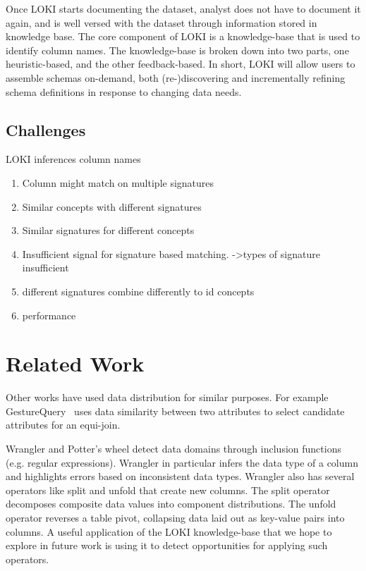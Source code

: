 \documentclass{vldb}
\begin{document}
Once LOKI starts documenting the dataset, analyst does not have to document it again, and is well versed with the dataset through information stored in knowledge base. The core component of LOKI is a knowledge-base that is used to identify column names. The knowledge-base is broken down into two parts, one heuristic-based, and the other feedback-based. In short, LOKI will allow users to assemble schemas on-demand, both (re-)discovering and incrementally refining schema definitions in response to changing data needs. 

\subsection{Challenges}
LOKI inferences column names 
\begin{enumerate}
	\item Column might match on multiple signatures
	\item Similar concepts with different signatures
	\item Similar signatures for different concepts
	\item Insufficient signal for signature based matching.
	->types of signature insufficient
	\item different signatures combine differently to id concepts
	\item performance
\end{enumerate}

\section{Related Work}
Other works have used data distribution for similar purposes. For example GestureQuery~\cite{nandi2013gestural} uses data similarity between two attributes to select candidate attributes for an equi-join.  

Wrangler \cite{kandel2011wrangler} and Potter's wheel \cite{raman2001potter} detect data domains through inclusion functions (e.g. regular expressions).
Wrangler in particular infers the data type of a column and highlights errors based on inconsistent data types. 
Wrangler also has several operators like split and unfold that create new columns.
The split operator decomposes composite data values into component distributions.  
The unfold operator reverses a table pivot, collapsing data laid out as key-value pairs into columns.  
A useful application of the LOKI knowledge-base that we hope to explore in future work is using it to detect opportunities for applying such operators.
\end{document}
